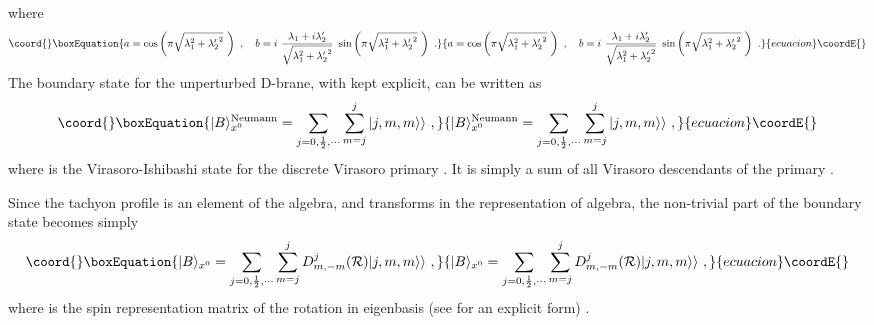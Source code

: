 \documentclass[a4paper,12pt]{article}
\begin{document}
where 
\begin{equation}\coord{}\boxEquation{
a= \cos  \left(\pi \sqrt{\lambda_1^2+{\lambda'_2}^2}~\right)~, ~~~
b= i ~{\lambda_1+ i \lambda'_2\over \sqrt{\lambda_1^2+{\lambda'_2}^2}}
~\sin \left(\pi \sqrt{\lambda_1^2+{\lambda'_2}^2}~\right)
~.
}{
a= \cos  \left(\pi \sqrt{\lambda_1^2+{\lambda'_2}^2}~\right)~, ~~~
b= i ~{\lambda_1+ i \lambda'_2\over \sqrt{\lambda_1^2+{\lambda'_2}^2}}
~\sin \left(\pi \sqrt{\lambda_1^2+{\lambda'_2}^2}~\right)
~.
}{ecuacion}\coordE{}\end{equation}
The boundary state for the unperturbed D-brane, with \coordHE{} kept explicit,
can be written as
\cite{Callan et al}
\begin{equation}\coord{}\boxEquation{
|B \rangle_{x^0}^{\rm Neumann} =  \sum_{j=0, \frac{1}{2}, \cdots}
\sum_{m=j}^j | j,m,m \rangle \rangle ~,
}{
|B \rangle_{x^0}^{\rm Neumann} =  \sum_{j=0, \frac{1}{2}, \cdots}
\sum_{m=j}^j | j,m,m \rangle \rangle ~,
}{ecuacion}\coordE{}\end{equation}
where \coordHE{} is the 
Virasoro-Ishibashi state \cite{Ishibashi} for the discrete Virasoro primary 
\coordHE{}. It is 
simply a sum of all Virasoro descendants of the primary \coordHE{}.

Since the tachyon profile \coordHE{} is an element of the \coordHE{} algebra, and 
\coordHE{} transforms in the \coordHE{} representation of \coordHE{} algebra, 
the non-trivial part of the boundary state becomes simply
\cite{Callan et al, PoTh, ReSc} 
\begin{equation}\coord{}\boxEquation{
|B \rangle_{x^0} =  \sum_{j=0, \frac{1}{2}, \cdots}
\sum_{m=j}^j D_{m,-m}^j ( {\cal R}) | j,m,m \rangle \rangle ~,
}{
|B \rangle_{x^0} =  \sum_{j=0, \frac{1}{2}, \cdots}
\sum_{m=j}^j D_{m,-m}^j ( {\cal R}) | j,m,m \rangle \rangle ~,
}{ecuacion}\coordE{}\end{equation}
where \coordHE{} is the spin \coordHE{} representation matrix of 
the rotation \coordHE{} in \coordHE{} eigenbasis (see \cite{ReSc} for an explicit form) .
\end{document}
